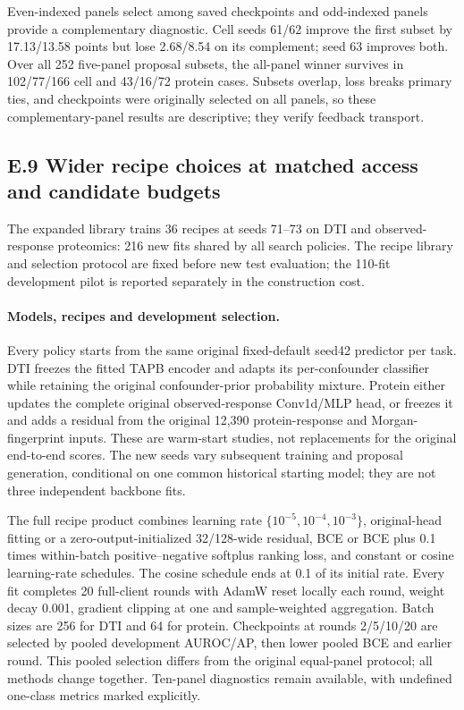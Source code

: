 

Even-indexed panels select among saved checkpoints and odd-indexed panels provide a complementary diagnostic. Cell seeds 61/62 improve the first subset by 17.13/13.58 points but lose 2.68/8.54 on its complement; seed 63 improves both. Over all 252 five-panel proposal subsets, the all-panel winner survives in 102/77/166 cell and 43/16/72 protein cases. Subsets overlap, loss breaks primary ties, and checkpoints were originally selected on all panels, so these complementary-panel results are descriptive; they verify feedback transport.

\clearpage
\subsection*{E.9 Wider recipe choices at matched access and candidate budgets}
The expanded library trains 36 recipes at seeds 71--73 on DTI and observed-response proteomics: 216 new fits shared by all search policies. The recipe library and selection protocol are fixed before new test evaluation; the 110-fit development pilot is reported separately in the construction cost.

\paragraph{Models, recipes and development selection.}
Every policy starts from the same original fixed-default seed42 predictor per task. DTI freezes the fitted TAPB encoder and adapts its per-confounder classifier while retaining the original confounder-prior probability mixture. Protein either updates the complete original observed-response Conv1d/MLP head, or freezes it and adds a residual from the original 12,390 protein-response and Morgan-fingerprint inputs. These are warm-start studies, not replacements for the original end-to-end scores. The new seeds vary subsequent training and proposal generation, conditional on one common historical starting model; they are not three independent backbone fits.

The full recipe product combines learning rate $\{10^{-5},10^{-4},10^{-3}\}$, original-head fitting or a zero-output-initialized 32/128-wide residual, BCE or BCE plus 0.1 times within-batch positive--negative softplus ranking loss, and constant or cosine learning-rate schedules. The cosine schedule ends at 0.1 of its initial rate. Every fit completes 20 full-client rounds with AdamW reset locally each round, weight decay 0.001, gradient clipping at one and sample-weighted aggregation. Batch sizes are 256 for DTI and 64 for protein. Checkpoints at rounds 2/5/10/20 are selected by pooled development AUROC/AP, then lower pooled BCE and earlier round. This pooled selection differs from the original equal-panel protocol; all methods change together. Ten-panel diagnostics remain available, with undefined one-class metrics marked explicitly.

